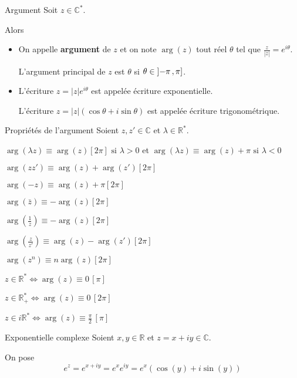     \begin{defi}{Argument}{}
        Soit $z \in \mathbb{C}^*$.
    
        Alors
            \begin{itemize}
                \item On appelle \textbf{argument} de $z$ et on note $\arg(z)$ tout réel $\theta$ tel que $\frac{z}{|z|} = e^{i \theta}$. 
          
                L’argument principal de $z$ est $\theta$ si $\theta \in \left] -\pi \, , \pi \right]$.
                \item L’écriture $z = |z|e^{i \theta}$ est appelée écriture exponentielle. 
                
                L’écriture $z = |z|(\cos\theta + i\sin\theta)$ est appelée écriture trigonométrique.
            \end{itemize}
    \end{defi}

    \begin{prop}{Propriétés de l’argument}{}
        Soient $z,z' \in \mathbb{C}$ et $\lambda \in \mathbb{R}^*$.
    
        \begin{alors}
            \item $\arg(\lambda z) \equiv \arg(z) [2 \pi] \text{ si } \lambda > 0$  et $\arg(\lambda z) \equiv \arg(z) + \pi \text{ si } \lambda < 0$
            \item $\arg(zz') \equiv \arg(z) + \arg(z') [2 \pi]$
            \item $\arg(-z) \equiv \arg(z) + \pi [2 \pi]$
            \item $\arg(\bar{z}) \equiv -\arg(z) [2 \pi]$
            \item $\arg\left(\frac{1}{z}\right) \equiv -\arg(z) [2 \pi]$
            \item $\arg\left(\frac{z}{z'}\right) \equiv \arg(z) - \arg(z') [2 \pi]$
            \item $\arg(z^n) \equiv n\arg(z) [2 \pi]$
            \item $z \in \mathbb{R}^* \iff \arg(z) \equiv 0 \, [\pi]$
		    \item $z \in \mathbb{R}^*_+ \iff \arg(z) \equiv 0 \, [2 \pi]$
		    \item $z \in i \mathbb{R}^* \iff \arg(z) \equiv \frac{\pi}{2} \, [\pi]$
        \end{alors}
    \end{prop}

    \begin{defi}{Exponentielle complexe}{}
        Soient $x,y \in \mathbb{R}$ et $z = x + iy \in \mathbb{C}$.
    
        On pose \[ e^z = e^{x +iy} = e^x e^{iy} = e^x (\cos(y) + i\sin(y)) \]
    \end{defi}


